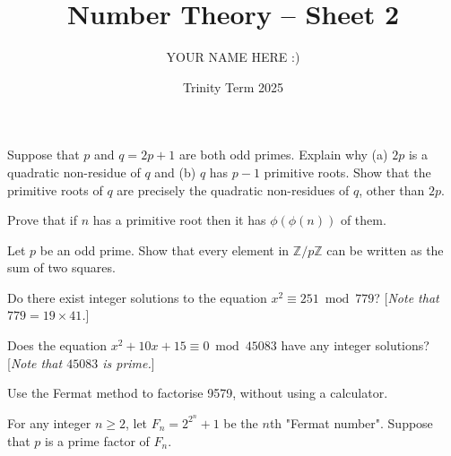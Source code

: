 \documentclass[answers]{exam}
\title{Number Theory -- Sheet 2}
\author{YOUR NAME HERE :)}
\date{Trinity Term 2025}
\begin{document}
\maketitle
\begin{questions}

\question%
Suppose that $p$ and $q=2 p+1$ are both odd primes. Explain why (a) $2 p$ is a quadratic non-residue of $q$ and (b) $q$ has $p-1$ primitive roots. Show that the primitive roots of $q$ are precisely the quadratic non-residues of $q$, other than $2 p$.



\question%
Prove that if $n$ has a primitive root then it has $\phi(\phi(n))$ of them.



\question%
Let $p$ be an odd prime. Show that every element in $\mathbb{Z} / p \mathbb{Z}$ can be written as the sum of two squares.



\question%
Do there exist integer solutions to the equation $x^2 \equiv 251 \bmod 779$? [\emph{Note that $779=19 \times 41$.}]



\question%
Does the equation $x^2+10 x+15 \equiv 0 \bmod 45083$ have any integer solutions? [\emph{Note that $45083$ is prime.}]


\question%
Use the Fermat method to factorise 9579, without using a calculator.



\question%
For any integer $n \geqslant 2$, let $F_{n}=2^{2^n}+1$ be the $n$th "Fermat number". Suppose that $p$ is a prime factor of $F_n$.




\end{questions}
\end{document}
